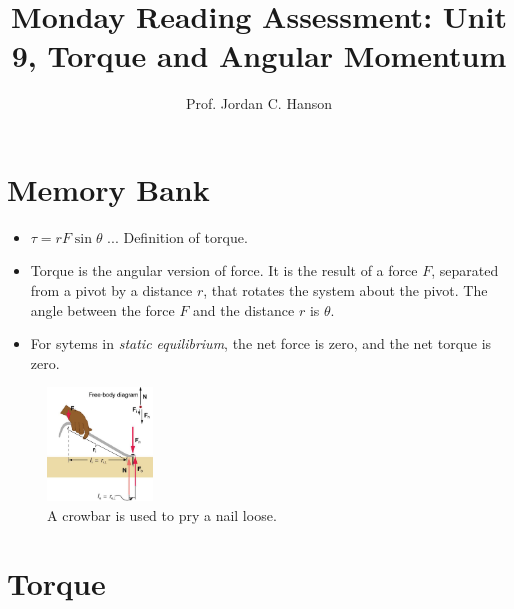 \documentclass{article}
\begin{document}
\title{Monday Reading Assessment: Unit 9, Torque and Angular Momentum}
\author{Prof. Jordan C. Hanson}

\maketitle

\section{Memory Bank}

\begin{itemize}
\item $\tau = r F \sin\theta$ ... Definition of torque.
\item Torque is the angular version of force.  It is the result of a force $F$, separated from a pivot by a distance $r$, that rotates the system about the pivot.  The angle between the force $F$ and the distance $r$ is $\theta$.
\item For sytems in \textit{static equilibrium}, the net force is zero, and the net torque is zero.
\end{itemize}

\begin{figure}[ht]
\centering
\includegraphics[width=0.25\textwidth]{figures/nail1.jpeg}
\caption{\label{fig:torque} A crowbar is used to pry a nail loose.}
\end{figure}

\section{Torque}
\end{document}
